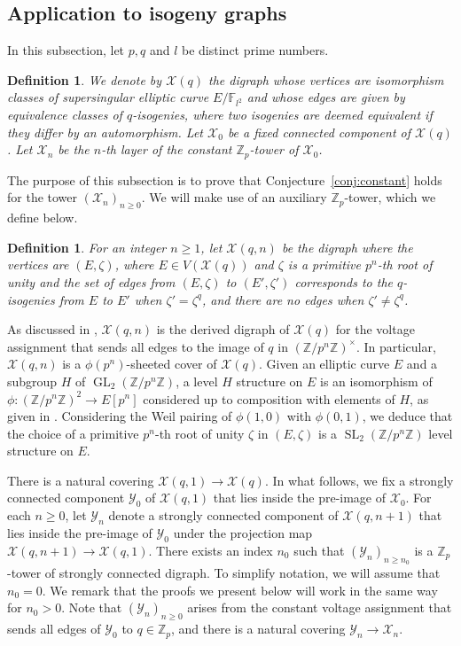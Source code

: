 \documentclass[11pt]{amsart}
\DeclareMathOperator{\GL}{GL}
\DeclareMathOperator{\SL}{SL}
\newtheorem{defn}[theorem]{Definition}
\numberwithin{equation}{section}
\theoremstyle{remark}
\newcommand{\?}{\stackrel{?}{=}}
\newcommand{\cX}{\mathcal{X}}
\newcommand{\ZZ}{\mathbb{Z}}
\newcommand{\Zp}{\mathbb{Z}_p}
\newcommand{\Z}{\mathbb{Z}}
\newcommand{\cY}{\mathcal{Y}}
\begin{document}
\subsection{Application to isogeny graphs}
In this subsection, let $p,q$ and $l$ be distinct prime numbers. 

\begin{defn}\label{def:isogeny}
     We denote by $\mathcal{X}(q)$ the digraph whose vertices are isomorphism classes of supersingular elliptic curve $E/\mathbb{F}_{l^2}$ and whose edges are given by equivalence classes of $q$-isogenies, where two isogenies are deemed equivalent if they differ by an automorphism. Let $\mathcal{X}_0$ be a fixed connected component of $\mathcal{X}(q)$.  Let $\mathcal{X}_n$ be the $n$-th layer of the constant $\Z_p$-tower of $\mathcal{X}_0$. 
\end{defn}

The purpose of this subsection is to prove that Conjecture~\ref{conj:constant} holds for the tower $(\cX_n)_{n\ge0}$. 
We will make use of an auxiliary $\Zp$-tower, which we define below.
\begin{defn}
     For an integer $n\ge1$, let $\cX(q,n)$ be the digraph where the vertices are $(E,\zeta)$, where $E\in V(\cX(q))$ and $\zeta$ is a primitive $p^n$-th root of unity and the set of edges from $(E,\zeta)$ to $(E',\zeta')$ corresponds to the $q$-isogenies from $E$ to $E'$ when $\zeta'=\zeta^q$, and there are no edges when $\zeta'\ne \zeta^q$.
     \end{defn}


     As discussed in \cite[Example 5.7]{LM2}, $\cX(q,n)$ is the derived digraph of $\cX(q)$ for the voltage assignment that sends all edges to the image of $q$ in $(\ZZ/p^n\ZZ)^\times$. 
     In particular, $\cX(q,n)$ is a $\phi(p^n)$-sheeted cover of $\cX(q)$. Given an elliptic curve $E$ and a subgroup $H$ of $\GL_2(\ZZ/p^n\ZZ)$, a level $H$ structure on $E$ is an isomorphism of $\phi:(\ZZ/p^n\ZZ)^2\to E[p^n]$ considered up to composition with elements of $H$, as given in \cite[Definition 1.1]{codogni-lido}. Considering the Weil pairing of $\phi(1,0)$ with $\phi(0,1)$, we deduce that the choice of a primitive $p^n$-th root of unity $\zeta$ in $(E,\zeta)$ is  a  $\SL_2(\ZZ/p^n\ZZ)$ level structure on $E$.
     
     There is a natural covering $\cX(q,1)\to\cX(q)$.
     In what follows, we fix a strongly connected component $\cY_0$ of $\cX(q,1)$ that lies inside the pre-image of $\cX_0$. For each $n\ge0$, let $\cY_n$ denote a strongly connected component of $\cX(q,n+1)$ that lies inside the pre-image of $\cY_0$ under the projection map $\cX(q,n+1)\to\cX(q,1)$. There exists an index $n_0$ such that $(\cY_n)_{n\ge n_0}$ is a $\Zp$-tower of strongly connected digraph. To simplify notation, we will assume that $n_0=0$. We remark that the proofs we present below will work in the same way for $n_0>0$. Note that $(\cY_n)_{n\ge 0}$ arises from the constant voltage assignment that sends all edges of $\cY_0$ to $q\in\Zp$, and there is a natural covering $\cY_n\to \cX_n$.
\end{document}
